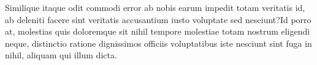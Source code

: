 \documentclass[letterpaper]{article} %
\begin{document}
{
\small

Similique itaque odit commodi error ab nobis earum impedit totam veritatis id, ab deleniti facere sint veritatis accusantium iusto voluptate sed nesciunt?Id porro at, molestias quis doloremque sit nihil tempore molestiae totam nostrum eligendi neque, distinctio ratione dignissimos officiis voluptatibus iste nesciunt sint fuga in nihil, aliquam qui illum dicta.\clearpage

}
\end{document}
